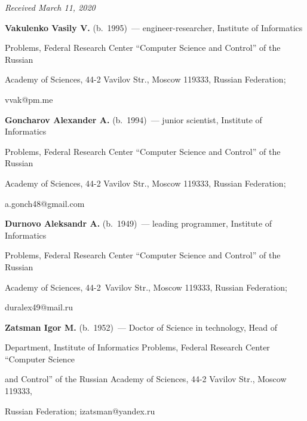\vspace*{-3pt}



\hfill{\small\textit{Received March 11, 2020}} 












\Contr



\noindent

\textbf{Vakulenko Vasily V.} (b.\ 1995)~--- engineer-researcher, Institute of Informatics 

Problems, Federal Research Center ``Computer Science and Control'' of the Russian 

Academy of Sciences, 44-2 Vavilov Str., Moscow 119333, Russian Federation; 

\mbox{vvak@pm.me} 



\vspace*{3pt}



\noindent

\textbf{Goncharov Alexander A.} (b.\ 1994)~--- junior scientist, Institute of Informatics 

Problems, Federal Research Center ``Computer Science and Control'' of the Russian 

Academy of Sciences, 44-2 Vavilov Str., Moscow 119333, Russian Federation; 

\mbox{a.gonch48@gmail.com}



\vspace*{3pt}



\noindent

\textbf{Durnovo Aleksandr A.} (b.\ 1949)~--- leading programmer, Institute of Informatics 

Problems, Federal Research Center ``Computer Science and Control'' of the Russian 

Academy of Sciences, 44-2~Vavilov Str., Moscow 119333, Russian Federation; 

\mbox{duralex49@mail.ru}



\vspace*{3pt}



\noindent

\textbf{Zatsman Igor M.} (b.\ 1952)~--- Doctor of Science in technology, Head of 

Department, Institute of Informatics Problems, Federal Research Center ``Computer Science 

and Control'' of the Russian Academy of Sciences, 44-2 Vavilov Str., Moscow 119333, 

Russian Federation; \mbox{izatsman@yandex.ru}

\label{end\stat}



\renewcommand{\bibname}{\protect\rm Литература} 

